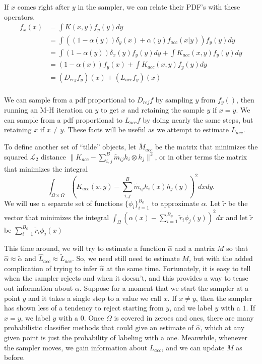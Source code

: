 \documentclass{article}
\newcommand\EMK[1]{\textcolor{purple}{EMK: #1}}
\begin{document}
If $x$ comes right after $y$ in the sampler, we can relate their PDF's with these operators.
\begin{align*}
 f_x(x) &= \int K(x, y)f_y(y)dy \\
&= \int ((1-\alpha(y))\delta_{y}(x) + \alpha(y)f_{acc}(x|y))f_y(y)dy \\
&= \int (1-\alpha(y))\delta_{x}(y)f_y(y)dy + \int K_{acc}(x,y)f_y(y)dy \\
&=  (1-\alpha(x))f_y(x) + \int K_{acc}(x,y)f_y(y)dy \\
&=  (D_{rej}f_y)(x) + (L_{acc}f_y)(x) \\
\end{align*}

We can sample from a pdf proportional to $D_{rej}f$ by sampling $y$ from $f_y()$, then running an M-H iteration on $y$ to get $x$ and retaining the sample $y$ if $x = y$. We can sample from a pdf proportional to $L_{acc}f$ by doing nearly the same steps, but retaining $x$ if $x \neq y$. These facts will be useful as we attempt to estimate $L_{acc}$.

To define another set of ``tilde'' objects, let  $\tilde{M}_{acc}$ be the matrix that minimizes the squared $\mathcal{L}_2$ distance $\|K_{acc} - \sum_{i,j}^B\tilde{m}_{ij} h_i \otimes h_j\|^2$, or in other terms the matrix that minimizes the integral $$\int_{\Omega\times\Omega}(K_{acc}(x,y) - \sum_{i,j}^B\tilde{m}_{ij} h_i(x)h_j(y))^2dx dy .$$ We will use a separate set of functions $\{\phi_i\}_{i=1}^{B_\phi}$ to approximate $\alpha$. Let $\tilde{r}$ be the vector that minimizes the integral $\int_{\Omega}(\alpha(x) -  \sum_{i=1}^{B_\phi}\tilde{r}_{i} \phi_j(y))^2dx  $ and let $\tilde{r}$ be $\sum_{i=1}^{B_\phi}\tilde{r}_{i} \phi_j(x)$

This time around, we will try to estimate a function $\hat{\alpha}$ and a matrix $M$ so that $\hat{\alpha}\approx \tilde{\alpha}$ and $\hat{L}_{acc} \approx \tilde{L}_{acc}$.%
 So, we need still need to estimate $M$, but with the added complication of trying to infer $\hat{\alpha}$ at the same time. Fortunately, it is easy to tell when the sampler rejects and when it doesn't, and this provides a way to tease out information about $\alpha$. Suppose for a moment that we start the sampler at a point $y$ and it takes a single step to a value we call $x$. If $x\neq y$, then the sampler has shown less of a tendency to reject starting from $y$, and we label $y$ with a $1$. If $x = y$, we label $y$ with a $0$. Once $\Omega$ is covered in zeroes and ones, there are many probabilistic classifier methods that could give an estimate of $\hat{\alpha}$, which at any given point is just the probability of labeling with a one. Meanwhile, whenever the sampler moves, we gain information about $L_{acc}$, and we can update $M$ as before. 
\end{document}
